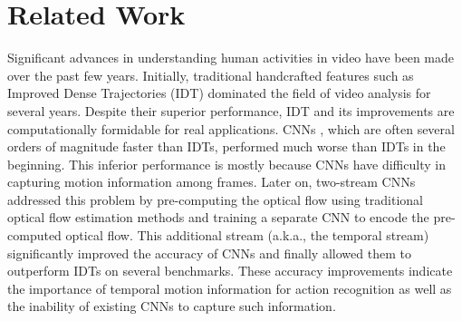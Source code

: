 \documentclass[runningheads]{llncs}
\begin{document}
		\section{Related Work}
		\label{sec:related}
		Significant advances in understanding human activities in video have been made over the past few years. Initially, traditional handcrafted features such as Improved Dense Trajectories (IDT) \cite{idtfWang2013} dominated the field of video analysis for several years. Despite their superior performance, IDT and its improvements are computationally formidable for real applications. CNNs \cite{KarpathyCVPR14,c3d2015}, which are often several orders of magnitude faster than IDTs, performed much worse than IDTs in the beginning. This inferior performance is mostly because CNNs have difficulty in capturing motion information among frames. Later on, two-stream CNNs \cite{twostream2014} addressed this problem by pre-computing the optical flow using traditional optical flow estimation methods \cite{TVL1realTime} and training a separate CNN to encode the pre-computed optical flow. This additional stream (a.k.a., the temporal stream) significantly improved the accuracy of CNNs and finally allowed them to outperform IDTs on several benchmarks. These accuracy improvements indicate the importance of temporal motion information for action recognition as well as the inability of existing CNNs to capture such information. 
		
\end{document}
